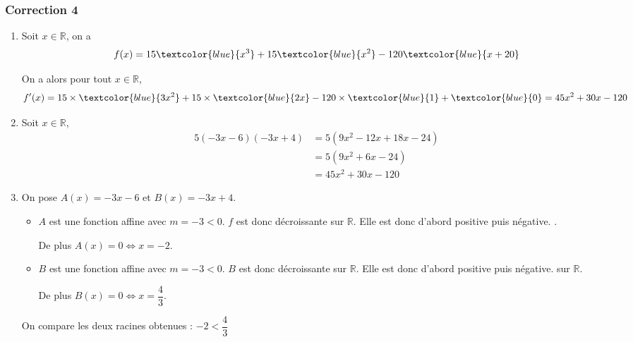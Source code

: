 \documentclass[15pt, mathserif]{beamer}
\newcommand{\R}{\mathbb{R}}			%
\begin{document}
\begin{frame}
\vspace{-10mm}
	\frametitle{Correction 4}
\begin{enumerate} 
 	 \item Soit $x \in \R$, on a $$f(x)=15\textcolor{blue}{x^3}+15\textcolor{blue}{x^2}-120\textcolor{blue}{x+20}$$
 
 On a alors pour tout $x \in  \R$, $$f'(x)= 15\times \textcolor{blue}{3x^2} +15\times \textcolor{blue}{2x}-120\times \textcolor{blue}{1}+\textcolor{blue}{0}=45x^2+30x-120$$
 	 \item Soit $x \in \R$, \begin{align*} 
 5(-3x-6)(-3x+4) & = 5\left( 9x^2 -12x +18x -24\right) \\ 
 &=  5\left( 9x^2 +6x -24\right) \\ 
 &= 45x^2 +30x -120
 \end{align*} \end{enumerate} 
 
 \end{frame} 
 
 \begin{frame} 
 
 \begin{enumerate} 
 \setcounter{enumi}{2} 
 
 	 \item On pose $A(x)= -3x-6$ et $B(x) = -3x+4$.
 \bigskip 
 \begin{itemize}
	\item $A$ est une fonction affine avec $m =-3<0$. $f$ est donc décroissante sur $\mathbb{R}$. Elle est donc d'abord positive puis négative. .

	 De plus $A(x) = 0 \Leftrightarrow x = -2$. 
 \bigskip 
	\item $B$ est une fonction affine avec $m =-3<0$. $B$ est donc décroissante sur $\mathbb{R}$. Elle est donc d'abord positive puis négative. sur $\mathbb{R}$.

	 De plus $B(x) = 0 \Leftrightarrow x = \dfrac{4}{3}$.
\end{itemize}
 On compare les deux racines obtenues : $ -2 < \dfrac{4}{3}$ 
 \end{enumerate} 
 
 \end{frame}
\end{document}

